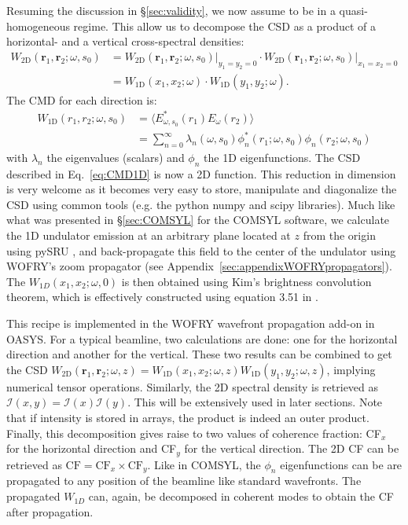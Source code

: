 \documentclass{iucr}              %
\begin{document}
Resuming the discussion in \S\ref{sec:validity}, we now assume to be in a quasi-homogeneous regime. This allow us to decompose the CSD as a product of a horizontal- and a vertical cross-spectral densities:
\begin{equation}\label{eq:CSD_2D_bis}
\begin{split}
W_\text{2D}(\textbf{r}_1,\textbf{r}_2;\omega,s_0) &= W_\text{2D}(\textbf{r}_1,\textbf{r}_2;\omega,s_0)\big\rvert_{y_1=y_2=0} \cdot W_\text{2D}(\textbf{r}_1,\textbf{r}_2;\omega,s_0)\big\rvert_{x_1=x_2=0}\\
&= W_\text{1D}(x_1,x_2;\omega)\cdot W_\text{1D}(y_1,y_2;\omega).
\end{split}
\end{equation}
The CMD for each direction is:
\begin{equation}\begin{split}
W_\text{1D}(r_1,r_2;\omega,s_0) &= \big\langle E^*_{\omega,s_0}(r_1) E_{\omega}(r_2)\big\rangle \\&=  \sum_{n=0}^{\infty} \lambda_n(\omega,s_0) \phi_n^*(r_1;\omega,s_0) \phi_n(r_2;\omega,s_0) 
\end{split}\label{eq:CMD1D}
\end{equation}
with $\lambda_n$ the eigenvalues (scalars) and $\phi_n$ the 1D eigenfunctions. The CSD described in Eq.~\ref{eq:CMD1D} is now a 2D function. This reduction in dimension is very welcome as it becomes very easy to store, manipulate and diagonalize the CSD using common tools (e.g. the python numpy and scipy libraries). Much like what was presented in \S\ref{sec:COMSYL} for the COMSYL software,  we calculate the 1D undulator emission at an arbitrary plane located at $z$ from the origin using pySRU \cite{pySRU}, and back-propagate this field  to the center of the undulator using WOFRY's zoom propagator (see Appendix~\ref{sec:appendixWOFRYpropagators}). The $W_{1D}(x_1,x_2;\omega,0)$ is then obtained using Kim's brightness convolution theorem, which is effectively constructed using equation 3.51 in \cite{glass2017}.

This recipe is implemented in the WOFRY wavefront propagation add-on in OASYS. For a typical beamline, two calculations are done: one for the horizontal direction and another for the vertical. These two results can be combined to get the CSD $W_\text{2D}(\textbf{r}_1,\textbf{r}_2;\omega,z)=W_\text{1D}(x_1,x_2;\omega,z) W_\text{1D}(y_1,y_2;\omega,z)$, implying numerical tensor operations. Similarly, the 2D spectral density is retrieved as $\mathcal{I}(x,y)=\mathcal{I}(x) \mathcal{I}(y)$. This will be extensively used in later sections. Note that if intensity is stored in arrays, the product is indeed an outer product. Finally, this decomposition gives raise to two values of coherence fraction: CF$_x$ for the horizontal direction and CF$_y$ for the vertical direction. The 2D CF can be retrieved as $\text{CF}=\text{CF}_{x} \times \text{CF}_{y}$. Like in COMSYL, the $\phi_n$ eigenfunctions can be are propagated to any position of the beamline like standard wavefronts. The propagated $W_{1D}$ can, again, be decomposed in coherent modes to obtain the CF after propagation. 
\end{document}
